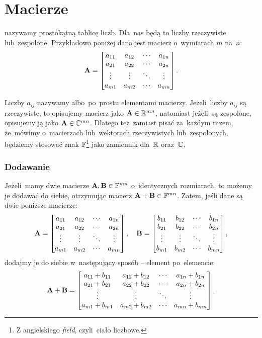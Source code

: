 \section{Macierze}
 nazywamy prostokątną tablicę liczb. Dla~nas
będą to liczby rzeczywiste lub~zespolone.
Przykładowo poniżej dana jest macierz o~wymiarach $m$ na~$n$:
$$
	\mathbf{A} =
	\begin{bmatrix}
		a_{11} & a_{12} & \cdots & a_{1n} \\
		a_{21} & a_{22} & \cdots & a_{2n} \\
		\vdots & \vdots & \ddots & \vdots \\
		a_{m1} & a_{m2} & \cdots & a_{mn}
	\end{bmatrix}.
$$

Liczby $a_{ij}$ nazywamy  albo~po~prostu
elementami macierzy.
Jeżeli~liczby $a_{ij}$ są rzeczywiste, to opisujemy macierz jako $\mathbf{A}\in
	\mathbb{R}^{mn}$, natomiast jeżeli~są zespolone, opisujemy ją jako $\mathbf{A}\in\mathbb{C}^{mn}$. Dlatego
też~zamiast pisać za~każdym razem, że~mówimy o~macierzach lub~wektorach
rzeczywistych lub~zespolonych, będziemy stosować znak $\mathbb{F}$\footnote{Z angielskiego \emph{field},
	czyli~ciało liczbowe.} jako zamiennik dla~$\mathbb{R}$ oraz~$\mathbb{C}$.


\subsubsection{Dodawanie}
Jeżeli~mamy dwie macierze $\mathbf{A}, \mathbf{B}\in \mathbb{F}^{mn}$ o~identycznych
rozmiarach, to możemy je dodawać do siebie, otrzymując macierz $\mathbf{A} +
	\mathbf{B}\in \mathbb{F}^{mn}$. Zatem, jeśli dane są dwie poniższe macierze:
$$
	\mathbf{A} =
	\begin{bmatrix}
		a_{11} & a_{12} & \cdots & a_{1n} \\
		a_{21} & a_{22} & \cdots & a_{2n} \\
		\vdots & \vdots & \ddots & \vdots \\
		a_{m1} & a_{m2} & \cdots & a_{mn}
	\end{bmatrix}, \quad
	\mathbf{B} =
	\begin{bmatrix}
		b_{11} & b_{12} & \cdots & b_{1n} \\
		b_{21} & b_{22} & \cdots & b_{2n} \\
		\vdots & \vdots & \ddots & \vdots \\
		b_{m1} & b_{m2} & \cdots & b_{mn}
	\end{bmatrix},
$$
dodajmy je do siebie w~następujący sposób -- element po~elemencie:
$$
	\mathbf{A} + \mathbf{B} =
	\begin{bmatrix}
		a_{11} + b_{11} & a_{12} + b_{12} & \cdots & a_{1n} + b_{1n} \\
		a_{21} + b_{21} & a_{22} + b_{22} & \cdots & a_{2n} + b_{2n} \\
		\vdots          & \vdots          & \ddots & \vdots          \\
		a_{m1} + b_{m1} & a_{m2} + b_{m2} & \cdots & a_{mn} + b_{mn} \\
	\end{bmatrix}.
$$

